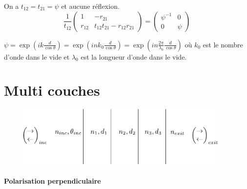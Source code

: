 \documentclass[a4paper,english]{article}
\begin{document}
On a $t_{12} = t_{21} = \psi$ et aucune réflexion.
\begin{equation}\label{mfresp}
\frac{1}{t_{12}}\begin{pmatrix} 1 & -r_{21} \\ r_{12} & t_{12}t_{21} - r_{12}r_{21} \end{pmatrix} = \begin{pmatrix} \psi^{-1} & 0 \\ 0 & \psi \end{pmatrix}
\end{equation}

$\psi = \exp(i k \frac{d}{\cos \theta}) = \exp(i n k_0 \frac{d}{\cos \theta}) = \exp(i n \frac{2\pi}{\lambda_0} \frac{d}{\cos \theta})$ où $k_0$ est le nombre d'onde dans le vide et $\lambda_0$ est la longueur d'onde dans le vide.
















\section{Multi couches}

\begin{figure}[H]
	\centering
	\includegraphics[height=3cm]{film.pdf}
\end{figure}
\paragraph{Polarisation perpendiculaire}
\end{document}
